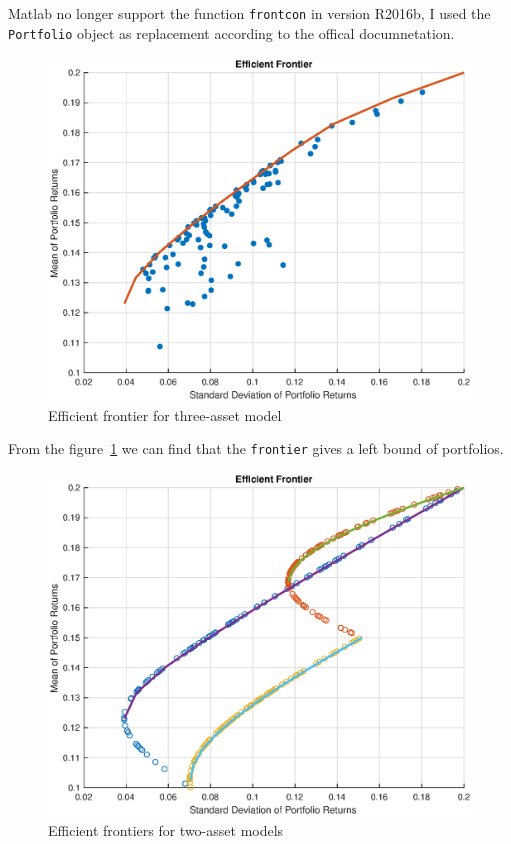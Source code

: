 \documentclass[a4paper, 12pt]{article}
\begin{document}
	\subsection{}
	
	Matlab no longer support the function \texttt{frontcon} in version R2016b, I used the \texttt{Portfolio} object as replacement according to the offical documnetation.
	\begin{figure}
		\begin{center}
		    \includegraphics[width=0.85\linewidth]{q1_b_1.eps}
		\end{center}
		\caption{Efficient frontier for three-asset model}
		\label{fig:q1_b_1}
	\end{figure}
	
	From the figure~\ref{fig:q1_b_1} we can find that the \texttt{frontier} gives a left bound of portfolios. 
	
	\begin{figure}
		\begin{center}
       		\includegraphics[width=0.85\linewidth]{q1_b_2.eps}
		\end{center}
		\caption{Efficient frontiers for two-asset models}
   		\label{fig:q1_b_2}
	\end{figure}
	
\end{document}
